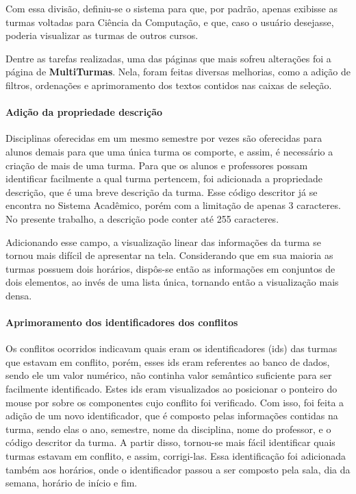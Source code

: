 Com essa divisão, definiu-se o sistema para que, por padrão, apenas exibisse as turmas voltadas para Ciência da Computação, e que, caso o usuário desejasse, poderia visualizar as turmas de outros cursos.

 \label{ssssec:MultiTurmas}

Dentre as tarefas realizadas, uma das páginas que mais sofreu alterações foi a página de \textbf{MultiTurmas}. Nela, foram feitas diversas melhorias, como a adição de filtros, ordenações e aprimoramento dos textos contidos nas caixas de seleção.

\paragraph*{Adição da propriedade \textbf{descrição}}

Disciplinas oferecidas em um mesmo semestre por vezes são oferecidas para alunos demais para que uma única turma os comporte, e assim, é necessário a criação de mais de uma turma. Para que os alunos e professores possam identificar facilmente a qual turma pertencem, foi adicionada a propriedade descrição, que é uma breve descrição da turma. Esse código descritor já se encontra no Sistema Acadêmico, porém com a limitação de apenas 3 caracteres. No presente trabalho, a descrição pode conter até 255 caracteres.

Adicionando esse campo, a visualização linear das informações da turma se tornou mais difícil de apresentar na tela. Considerando que em sua maioria as turmas possuem dois horários, dispôs-se então as informações em conjuntos de dois elementos, ao invés de uma lista única, tornando então a visualização mais densa.

\paragraph*{Aprimoramento dos identificadores dos conflitos}

Os conflitos ocorridos indicavam quais eram os identificadores (ids) das turmas que estavam em conflito, porém, esses ids eram referentes ao banco de dados, sendo ele um valor numérico, não continha valor semântico suficiente para ser facilmente identificado. Estes ids eram visualizados ao posicionar o ponteiro do mouse por sobre os componentes cujo conflito foi verificado. Com isso, foi feita a adição de um novo identificador, que é composto pelas informações contidas na turma, sendo elas o ano, semestre, nome da disciplina, nome do professor, e o código descritor da turma. A partir disso, tornou-se mais fácil identificar quais turmas estavam em conflito, e assim, corrigi-las. Essa identificação foi adicionada também aos horários, onde o identificador passou a ser composto pela sala, dia da semana, horário de início e fim.

